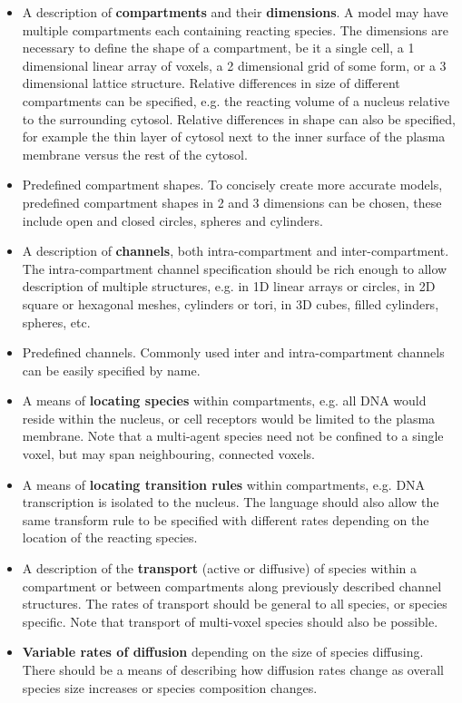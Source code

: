 \begin{itemize}
 \item A description of \textbf{compartments} and their \textbf{dimensions}. A model may have multiple compartments each containing reacting species. The dimensions are necessary to define the shape of a compartment, be it a single cell, a 1 dimensional linear array of voxels, a 2 dimensional grid of some form, or a 3 dimensional lattice structure. Relative differences in size of different compartments can be specified, e.g. the reacting volume of a nucleus relative to the surrounding cytosol. Relative differences in shape can also be specified, for example the thin layer of cytosol next to the inner surface of the plasma membrane versus the rest of the cytosol.

 \item Predefined compartment shapes. To concisely create more accurate models, predefined compartment shapes in 2 and 3 dimensions can be chosen, these include open and closed circles, spheres and cylinders. 

 \item A description of \textbf{channels}, both intra-compartment and inter-compartment. The intra-compartment channel specification should be rich enough to allow description of multiple structures, e.g. in 1D linear arrays or circles, in 2D square or hexagonal meshes, cylinders or tori, in 3D cubes, filled cylinders, spheres, etc.

 \item Predefined channels. Commonly used inter and intra-compartment channels can be easily specified by name.

 \item A means of \textbf{locating species} within compartments, e.g. all DNA would reside within the nucleus, or cell receptors would be limited to the plasma membrane. Note that a multi-agent species need not be confined to a single voxel, but may span neighbouring, connected voxels.

 \item A means of \textbf{locating transition rules} within compartments, e.g. DNA transcription is isolated to the nucleus. The language should also allow the same transform rule to be specified with different rates depending on the location of the reacting species.

 \item A description of the \textbf{transport} (active or diffusive) of species within a compartment or between compartments along previously described channel structures. The rates of transport should be general to all species, or species specific. Note that transport of multi-voxel species should also be possible.

 \item \textbf{Variable rates of diffusion} depending on the size of species diffusing. There should be a means of describing how diffusion rates change as overall species size increases or species composition changes.

\end{itemize}


